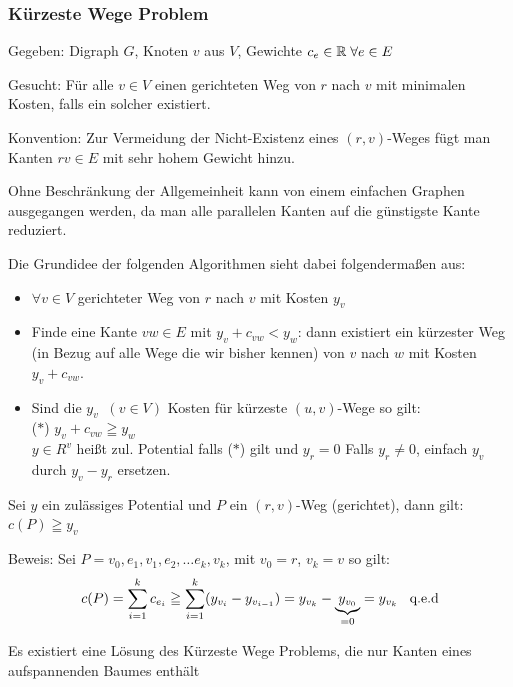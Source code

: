 \subsubsection{Kürzeste Wege Problem}
Gegeben: Digraph $G$, Knoten $v$ aus $V$, Gewichte $c_{e} \in \mathbb{R} \; \forall 
e \in E$ 

Gesucht: Für alle $v \in V$ einen gerichteten Weg von $r$ nach $v$ mit
minimalen Kosten, falls ein solcher existiert.

Konvention: Zur Vermeidung der Nicht-Existenz eines $(r,v)$-Weges fügt man
Kanten $r v \in E$ mit sehr hohem Gewicht hinzu.

Ohne Beschränkung der Allgemeinheit kann von einem einfachen Graphen
ausgegangen werden, da man alle parallelen Kanten auf die günstigste Kante
reduziert.

Die Grundidee der folgenden Algorithmen sieht dabei folgendermaßen aus:
\begin{itemize}
\item $\forall v  \in V$ gerichteter Weg von $r$ nach $v$ mit Kosten 
$y_{v}$
\item Finde eine Kante $v w \in E$ mit $y_{v} + c_{v w} < y_{w}$: dann existiert ein
kürzester Weg (in Bezug auf alle Wege die wir bisher kennen) von $v$ nach
$w$ mit Kosten $y_{v} + c_{v w}$. 
\item Sind die $y_{v}\;\; (v \in V)$ Kosten für kürzeste $(u,v)$-Wege so 
gilt:\\ ($\ast$) $y_{v} + c_{v w} \geqq y_{w}$\\
$y \in R^{v}$ heißt zul. Potential falls  ($\ast$) gilt und $y_{r}=0$
Falls $y_{r} \not= 0$, einfach $y_{v}$ durch $y_{v} - y_{r}$ ersetzen.  
\end{itemize}

\begin{lemma} \label{Potential}
Sei $y$ ein zulässiges Potential und $P$ ein $(r,v)$-Weg (gerichtet), dann
gilt: $c(P) \geqq y_{v}$\\
\end{lemma}

Beweis: Sei $P= v_{0}, e_{1}, v_{1}, e_{2}, \ldots e_{k}, v_{k}$, mit $v_{0} 
= r$, $v_{k}=v$ so gilt:
\[c(P) = \sum^{k}_{i=1} c_{e_{i}} \geqq \sum^{k}_{i=1}(y_{v_{i}} -
y_{v_{i-1}}) = y_{v_{k}} - \underbrace{y_{v_{0}}}_{=0} = y_{v_{k}} 
\hspace{3mm} \mbox{q.e.d}\]

\begin{lemma}
Es existiert eine Lösung des Kürzeste Wege Problems, die nur Kanten eines
aufspannenden Baumes enthält
\end{lemma}

